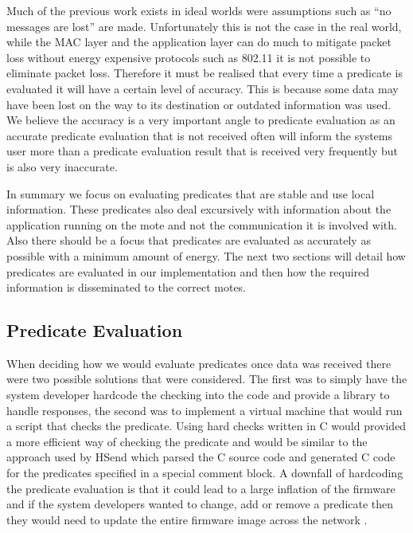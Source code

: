 Much of the previous work exists in ideal worlds were assumptions such as ``no messages are lost'' \cite{277788} are made. Unfortunately this is not the case in the real world, while the MAC layer and the application layer can do much to mitigate packet loss \cite{?} without energy expensive protocols such as 802.11 \cite{?} it is not possible to eliminate packet loss. Therefore it must be realised that every time a predicate is evaluated it will have a certain level of accuracy. This is because some data may have been lost on the way to its destination or outdated information was used. We believe the accuracy is a very important angle to predicate evaluation as an accurate predicate evaluation that is not received often will inform the systems user more than a predicate evaluation result that is received very frequently but is also very inaccurate.

In summary we focus on evaluating predicates that are stable and use local information. These predicates also deal excursively with information about the application running on the mote and not the communication it is involved with. Also there should be a focus that predicates are evaluated as accurately as possible with a minimum amount of energy. The next two sections will detail how predicates are evaluated in our implementation and then how the required information is disseminated to the correct motes.

\subsection{Predicate Evaluation}

When deciding how we would evaluate predicates once data was received there were two possible solutions that were considered. The first was to simply have the system developer hardcode the checking into the code and provide a library to handle responses, the second was to implement a virtual machine that would run a script that checks the predicate. Using hard checks written in C would provided a more efficient way of checking the predicate and would be similar to the approach used by HSend \cite{herbert2007adaptive} which parsed the C source code and generated C code for the predicates specified in a special comment block. A downfall of hardcoding the predicate evaluation is that it could lead to a large inflation of the firmware and if the system developers wanted to change, add or remove a predicate then they would need to update the entire firmware image across the network \cite{Dunkels:2006:RDL:1182807.1182810,1437066}.

